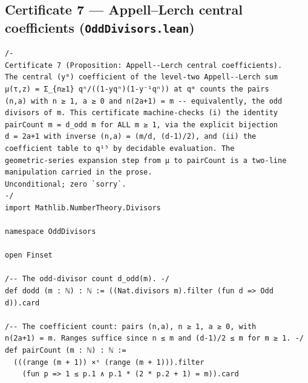 \documentclass[11pt,a4paper]{article}
\theoremstyle{plain}
\theoremstyle{definition}
\theoremstyle{remark}
\begin{document}
\subsection*{Certificate 7 --- Appell--Lerch central coefficients (\texttt{OddDivisors.lean})}
\begin{Verbatim}[fontsize=\footnotesize,breaklines=true,breakanywhere=true,formatcom=\leanmono]
/-
Certificate 7 (Proposition: Appell--Lerch central coefficients).
The central (y⁰) coefficient of the level-two Appell--Lerch sum
μ(τ,z) = Σ_{n≥1} qⁿ/((1-yqⁿ)(1-y⁻¹qⁿ)) at qᵐ counts the pairs
(n,a) with n ≥ 1, a ≥ 0 and n(2a+1) = m -- equivalently, the odd
divisors of m. This certificate machine-checks (i) the identity
pairCount m = d_odd m for ALL m ≥ 1, via the explicit bijection
d = 2a+1 with inverse (n,a) = (m/d, (d-1)/2), and (ii) the
coefficient table to q¹⁵ by decidable evaluation. The
geometric-series expansion step from μ to pairCount is a two-line
manipulation carried in the prose.
Unconditional; zero `sorry`.
-/
import Mathlib.NumberTheory.Divisors

namespace OddDivisors

open Finset

/-- The odd-divisor count d_odd(m). -/
def dodd (m : ℕ) : ℕ := ((Nat.divisors m).filter (fun d => Odd d)).card

/-- The coefficient count: pairs (n,a), n ≥ 1, a ≥ 0, with
n(2a+1) = m. Ranges suffice since n ≤ m and (d-1)/2 ≤ m for m ≥ 1. -/
def pairCount (m : ℕ) : ℕ :=
  (((range (m + 1)) ×ˢ (range (m + 1))).filter
    (fun p => 1 ≤ p.1 ∧ p.1 * (2 * p.2 + 1) = m)).card


\end{Verbatim}
\end{document}
